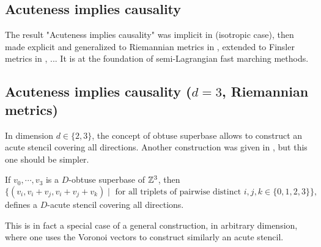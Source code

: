 


\subsection{Acuteness implies causality}

The result "Acuteness implies causality" was implicit in \cite{Tsitsiklis:1995EfficientTrajectories} (isotropic case), then made explicit and generalized to Riemannian metrics in \cite{Sethian2003OUM}, extended to Finsler metrics in \cite{Vladimirsky:2008LabelSetting}, ...
It is at the foundation of semi-Lagrangian fast marching methods.






\subsection{Acuteness implies causality ($d=3$, Riemannian metrics)}

In dimension $d\in \{2,3\}$, the concept of obtuse superbase allows to construct an acute stencil covering all directions. 
Another construction was given in \cite{Mirebeau:2014MarchingLattice}, but this one should be simpler.

\begin{proposition}
	If $v_0,\cdots,v_3$ is a $D$-obtuse superbase of $\mathbb{Z}^3$, then 
	\begin{equation}
		\{(v_i,v_i+v_j,v_i+v_j+v_k)\mid \text{ for all triplets of pairwise distinct } i,j,k\in \{0,1,2,3\}\},
	\end{equation}
	defines a $D$-acute stencil covering all directions.
\end{proposition}

This is in fact a special case of a general construction, in arbitrary dimension, where one uses the Voronoi vectors to construct similarly an acute stencil.

